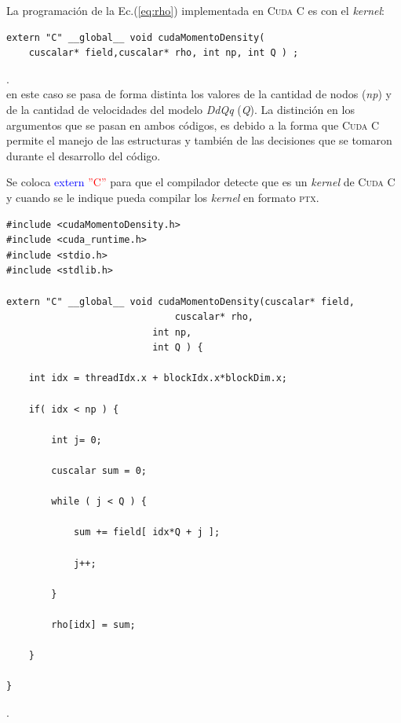 La programación de la Ec.(\ref{eq:rho}) implementada en \textsc{Cuda C} es con el \textit{kernel}:

{\footnotesize
	\begin{frame}{}
		\begin{lstlisting}
extern "C" __global__ void cudaMomentoDensity(
	cuscalar* field,cuscalar* rho, int np, int Q ) ; 
		\end{lstlisting}
		
	\end{frame}
}.
\\
en este caso se pasa de forma distinta los valores de la cantidad de nodos (\textit{np}) y de la cantidad de velocidades del modelo \textit{DdQq} (\textit{Q}). La distinción en los argumentos que se pasan en ambos códigos, es debido a la forma que \textsc{Cuda C} permite el manejo de las estructuras y también de las decisiones que se tomaron durante el desarrollo del código.

Se coloca \textcolor{blue}{extern} \textcolor{red}{''C''} para que el compilador detecte que es un \textit{kernel} de \textsc{Cuda C} y cuando se le indique pueda compilar los \textit{kernel} en formato \textsc{ptx}.

\newpage

{\footnotesize
	\begin{frame}{}
		\begin{lstlisting}[frame=single]
#include <cudaMomentoDensity.h>
#include <cuda_runtime.h>
#include <stdio.h>
#include <stdlib.h>

extern "C" __global__ void cudaMomentoDensity(cuscalar* field,
				              cuscalar* rho,
					      int np,
					      int Q ) {
							
	int idx = threadIdx.x + blockIdx.x*blockDim.x;	
	
	if( idx < np ) {	
	
		int j= 0;		
	
		cuscalar sum = 0;		
	
		while ( j < Q ) {		
	
			sum += field[ idx*Q + j ];			
	
			j++;			
	
		}				
	
		rho[idx] = sum;	
	
	}
	
}		
		\end{lstlisting}
		
	\end{frame}
}.
\\

